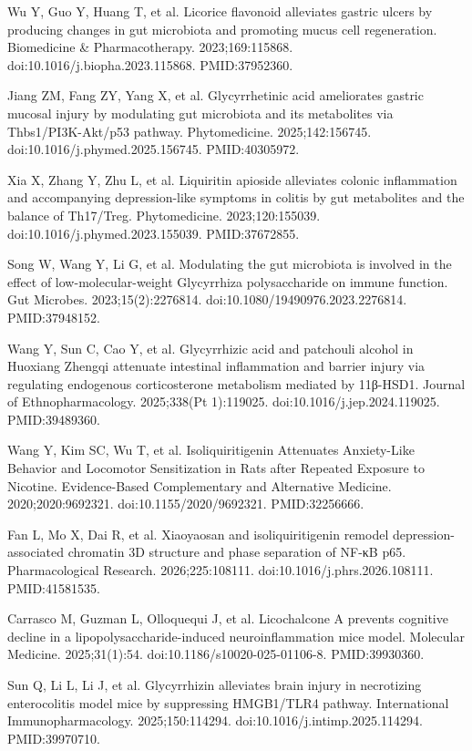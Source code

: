 \documentclass[12pt,oneside]{book}
\newcommand{\reff}[2]{\par\hangindent=7mm\hangafter=1\noindent[#1]\hspace{2mm}#2\par}
\begin{document}
\reff{18}{Wu Y, Guo Y, Huang T, et al. Licorice flavonoid alleviates gastric ulcers by producing changes in gut microbiota and promoting mucus cell regeneration. Biomedicine \& Pharmacotherapy. 2023;169:115868. doi:10.1016/j.biopha.2023.115868. PMID:37952360.}

\reff{19}{Jiang ZM, Fang ZY, Yang X, et al. Glycyrrhetinic acid ameliorates gastric mucosal injury by modulating gut microbiota and its metabolites via Thbs1/PI3K-Akt/p53 pathway. Phytomedicine. 2025;142:156745. doi:10.1016/j.phymed.2025.156745. PMID:40305972.}

\reff{20}{Xia X, Zhang Y, Zhu L, et al. Liquiritin apioside alleviates colonic inflammation and accompanying depression-like symptoms in colitis by gut metabolites and the balance of Th17/Treg. Phytomedicine. 2023;120:155039. doi:10.1016/j.phymed.2023.155039. PMID:37672855.}

\reff{21}{Song W, Wang Y, Li G, et al. Modulating the gut microbiota is involved in the effect of low-molecular-weight Glycyrrhiza polysaccharide on immune function. Gut Microbes. 2023;15(2):2276814. doi:10.1080/19490976.2023.2276814. PMID:37948152.}

\reff{22}{Wang Y, Sun C, Cao Y, et al. Glycyrrhizic acid and patchouli alcohol in Huoxiang Zhengqi attenuate intestinal inflammation and barrier injury via regulating endogenous corticosterone metabolism mediated by 11β-HSD1. Journal of Ethnopharmacology. 2025;338(Pt 1):119025. doi:10.1016/j.jep.2024.119025. PMID:39489360.}

\reff{23}{Wang Y, Kim SC, Wu T, et al. Isoliquiritigenin Attenuates Anxiety-Like Behavior and Locomotor Sensitization in Rats after Repeated Exposure to Nicotine. Evidence-Based Complementary and Alternative Medicine. 2020;2020:9692321. doi:10.1155/2020/9692321. PMID:32256666.}

\reff{24}{Fan L, Mo X, Dai R, et al. Xiaoyaosan and isoliquiritigenin remodel depression-associated chromatin 3D structure and phase separation of NF-κB p65. Pharmacological Research. 2026;225:108111. doi:10.1016/j.phrs.2026.108111. PMID:41581535.}

\reff{25}{Carrasco M, Guzman L, Olloquequi J, et al. Licochalcone A prevents cognitive decline in a lipopolysaccharide-induced neuroinflammation mice model. Molecular Medicine. 2025;31(1):54. doi:10.1186/s10020-025-01106-8. PMID:39930360.}

\reff{26}{Sun Q, Li L, Li J, et al. Glycyrrhizin alleviates brain injury in necrotizing enterocolitis model mice by suppressing HMGB1/TLR4 pathway. International Immunopharmacology. 2025;150:114294. doi:10.1016/j.intimp.2025.114294. PMID:39970710.}
\end{document}

